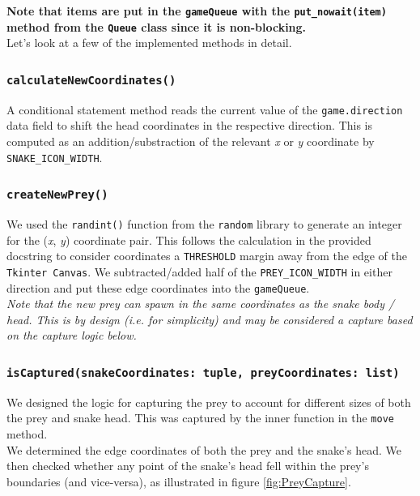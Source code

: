 \documentclass{article}
\begin{document}
\textbf{Note that items are put in the \texttt{gameQueue} with the \texttt{put\_nowait(item)} method from the \texttt{Queue} class since it is non-blocking.} \\

Let's look at a few of the implemented methods in detail.

\subsubsection{\texttt{calculateNewCoordinates()}}\label{sec:New_Snake_Coordinates}
A conditional statement  method reads the current value of the \texttt{game.direction} data field to
shift the head coordinates in the respective direction. This is computed as an addition/substraction of the relevant \textit{x} or \textit{y} coordinate by \texttt{SNAKE\_ICON\_WIDTH}.

\subsubsection{\texttt{createNewPrey()}}\label{sec:Prey_Generation}
We used the \texttt{randint()} function from the \texttt{random} library to generate an integer for the (\textit{x}, \textit{y}) coordinate pair. This follows the calculation
in the provided docstring to consider coordinates a \texttt{THRESHOLD} margin away from the edge of the \texttt{Tkinter Canvas}. We subtracted/added half of the \texttt{PREY\_ICON\_WIDTH}
in either direction and put these edge coordinates into the \texttt{gameQueue}. \\

\textit{Note that the new prey can spawn in the same coordinates as the snake body / head. This is by design (i.e. for simplicity) and may be considered a capture based on the capture logic below.}

\subsubsection{\texttt{isCaptured(snakeCoordinates: tuple, preyCoordinates: list)}}\label{sec:Prey_Capture}

We designed the logic for capturing the prey to account for different sizes of both the prey and snake head. This was captured by the inner function in the \texttt{move} method. \\

We determined the edge coordinates of both the prey and the snake's head. We then checked whether any point of the snake's head
fell within the prey's boundaries (and vice-versa), as illustrated in figure \ref{fig:PreyCapture}. \\
\end{document}
